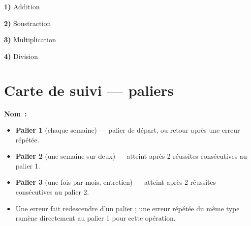 \vfill
\begin{tcbraster}[raster columns=2, raster rows=6, raster equal height, raster column skip=4mm, raster row skip=3mm,colframe=themeColor, colback=white, boxrule=0.5pt, arc=1mm, left=2mm, right=2mm, top=2mm, bottom=2mm]
\begin{tcolorbox}
\textbf{1)} \quad Addition\\[2mm]
\end{tcolorbox}
\begin{tcolorbox}
\textbf{2)} \quad Soustraction\\[2mm]
\end{tcolorbox}
\begin{tcolorbox}
\textbf{3)} \quad Multiplication\\[2mm]
\end{tcolorbox}
\begin{tcolorbox}
\textbf{4)} \quad Division\\[2mm]
\end{tcolorbox}
\end{tcbraster}

\section*{Carte de suivi --- paliers}

\noindent \textbf{Nom~:} \dotfill

\bigskip
\begin{tcolorbox}[colback=\themeColor!5, colframe=\themeColor, title=Principe des paliers, fonttitle=\bfseries]
\begin{itemize}[leftmargin=1.5em, itemsep=3pt]
\item \textbf{Palier 1} (chaque semaine) --- palier de départ, ou retour après une erreur répétée.
\item \textbf{Palier 2} (une semaine sur deux) --- atteint après 2 réussites consécutives au palier 1.
\item \textbf{Palier 3} (une fois par mois, entretien) --- atteint après 2 réussites consécutives au palier 2.
\item Une erreur fait redescendre d'un palier ; une erreur répétée du même type ramène directement au palier 1 pour cette opération.
\end{itemize}
\end{tcolorbox}

